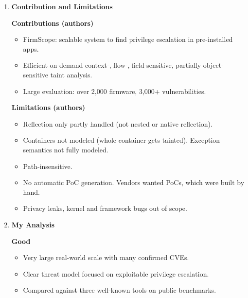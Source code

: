 \documentclass[11pt,a4paper]{article}
\newcommand{\entrypart}[1]{\textbf{\color{accent}#1}\par\vspace{2pt}}
\begin{document}
\begin{enumerate}
    \item \entrypart{Contribution and Limitations}

    \textbf{Contributions (authors)}
    \begin{itemize}
        \item FirmScope: scalable system to find privilege escalation in pre-installed apps.
        \item Efficient on-demand context-, flow-, field-sensitive, partially object-sensitive taint analysis.
        \item Large evaluation: over 2,000 firmware, 3,000+ vulnerabilities.
    \end{itemize}

    \vspace{4pt}
    \textbf{Limitations (authors)}
    \begin{itemize}
        \item Reflection only partly handled (not nested or native reflection).
        \item Containers not modeled (whole container gets tainted). Exception semantics not fully modeled.
        \item Path-insensitive.
        \item No automatic PoC generation. Vendors wanted PoCs, which were built by hand.
        \item Privacy leaks, kernel and framework bugs out of scope.
    \end{itemize}

    \item \entrypart{My Analysis}

    \textbf{Good}
    \begin{itemize}
        \item Very large real-world scale with many confirmed CVEs.
        \item Clear threat model focused on exploitable privilege escalation.
        \item Compared against three well-known tools on public benchmarks.
    \end{itemize}


\end{enumerate}
\end{document}
